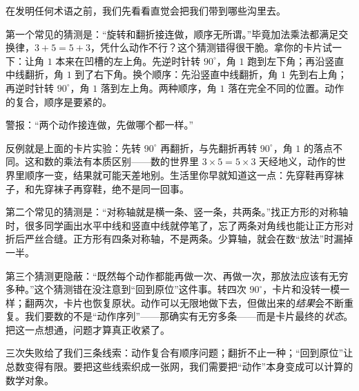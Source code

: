 在发明任何术语之前，我们先看看直觉会把我们带到哪些沟里去。

第一个常见的猜测是：“旋转和翻折接连做，顺序无所谓。”毕竟加法乘法都满足交换律，$3+5=5+3$，凭什么动作不行？这个猜测错得很干脆。拿你的卡片试一下：让角 $1$ 本来在凹槽的左上角。先逆时针转 $90^\circ$，角 $1$ 跑到左下角；再沿竖直中线翻折，角 $1$ 到了右下角。换个顺序：先沿竖直中线翻折，角 $1$ 先到右上角；再逆时针转 $90^\circ$，角 $1$ 落到左上角。两种顺序，角 $1$ 落在完全不同的位置。动作的复合，顺序是要紧的。

\begin{fanli}
警报：“两个动作接连做，先做哪个都一样。”

反例就是上面的卡片实验：先转 $90^\circ$ 再翻折，与先翻折再转 $90^\circ$，角 $1$ 的落点不同。这和数的乘法有本质区别——数的世界里 $3\times5=5\times3$ 天经地义，动作的世界里顺序一变，结果就可能天差地别。生活里你早就知道这一点：先穿鞋再穿袜子，和先穿袜子再穿鞋，绝不是同一回事。
\end{fanli}

第二个常见的猜测是：“对称轴就是横一条、竖一条，共两条。”找正方形的对称轴时，很多同学画出水平中线和竖直中线就停笔了，忘了两条对角线也能让正方形对折后严丝合缝。正方形有四条对称轴，不是两条。少算轴，就会在数“放法”时漏掉一半。

第三个猜测更隐蔽：“既然每个动作都能再做一次、再做一次，那放法应该有无穷多种。”这个猜测错在没注意到“回到原位”这件事。转四次 $90^\circ$，卡片和没转一模一样；翻两次，卡片也恢复原状。动作可以无限地做下去，但做出来的\emph{结果}会不断重复。我们要数的不是“动作序列”——那确实有无穷多条——而是卡片最终的\emph{状态}。把这一点想通，问题才算真正收紧了。

\begin{figure}[htbp]
\begin{center}
\end{center}
\end{figure}

三次失败给了我们三条线索：动作复合有顺序问题；翻折不止一种；“回到原位”让总数变得有限。要把这些线索织成一张网，我们需要把“动作”本身变成可以计算的数学对象。

